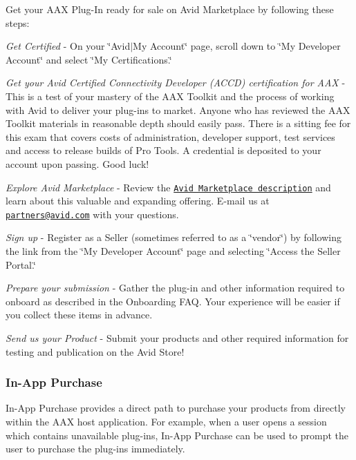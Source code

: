  Get your A\+A\+X Plug-\/\+In ready for sale on Avid Marketplace by following these steps\+: 
\begin{DoxyItemize}
\item {\itshape Get Certified} -\/ On your \char`\"{}\+Avid$\vert$\+My Account\char`\"{} page, scroll down to \char`\"{}\+My Developer Account\char`\"{} and select \char`\"{}\+My Certifications.\char`\"{}  
\item {\itshape Get your Avid Certified Connectivity Developer (A\+C\+C\+D) certification for A\+A\+X} -\/ This is a test of your mastery of the A\+A\+X Toolkit and the process of working with Avid to deliver your plug-\/ins to market. Anyone who has reviewed the A\+A\+X Toolkit materials in reasonable depth should easily pass. There is a sitting fee for this exam that covers costs of administration, developer support, test services and access to release builds of Pro Tools. A credential is deposited to your account upon passing. Good luck!  
\item {\itshape Explore Avid Marketplace} -\/ Review the \href{http://www.avid.com/alliance-partner-program/about-marketplace}{\tt Avid Marketplace description} and learn about this valuable and expanding offering. E-\/mail us at \href{mailto:partners@avid.com}{\tt partners@avid.\+com} with your questions.  
\item {\itshape Sign up} -\/ Register as a Seller (sometimes referred to as a \char`\"{}vendor\char`\"{}) by following the link from the \char`\"{}\+My Developer Account\char`\"{} page and selecting \char`\"{}\+Access the Seller Portal.\char`\"{}  
\item {\itshape Prepare your submission} -\/ Gather the plug-\/in and other information required to onboard as described in the Onboarding F\+A\+Q. Your experience will be easier if you collect these items in advance.  
\item {\itshape Send us your Product} -\/ Submit your products and other required information for testing and publication on the Avid Store!  
\end{DoxyItemize}

\hypertarget{a00372_aax_distributing_selling_inapppurchase}{}\subsubsection{In-\/\+App Purchase}\label{a00372_aax_distributing_selling_inapppurchase}
 In-\/\+App Purchase provides a direct path to purchase your products from directly within the A\+A\+X host application. For example, when a user opens a session which contains unavailable plug-\/ins, In-\/\+App Purchase can be used to prompt the user to purchase the plug-\/ins immediately.

